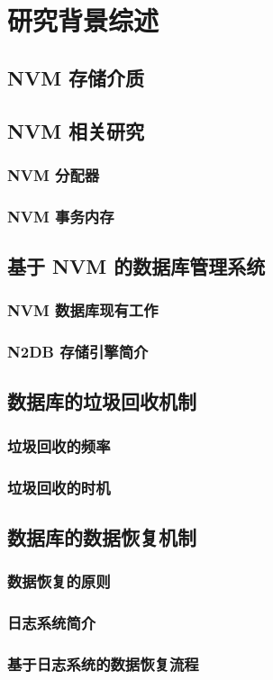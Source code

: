 
\chapter{研究背景综述}

\section{NVM 存储介质}

\section{NVM 相关研究}

\subsection{NVM 分配器}

\subsection{NVM 事务内存}

\section{基于 NVM 的数据库管理系统}

\subsection{NVM 数据库现有工作}

\subsection{N2DB 存储引擎简介}

\section{数据库的垃圾回收机制}

\subsection{垃圾回收的频率}

\subsection{垃圾回收的时机}

\section{数据库的数据恢复机制}

\subsection{数据恢复的原则}

\subsection{日志系统简介}

\subsection{基于日志系统的数据恢复流程}


